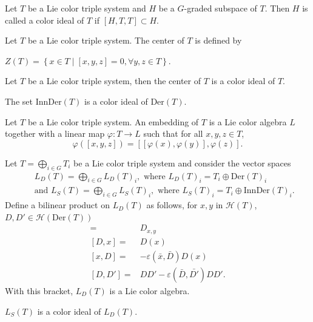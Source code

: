 \documentclass[11pt, twoside]{article}
\begin{document}
\begin{defi}[\cite{KZ23}]
    Let $T$ be a Lie color triple system and $H $ be a $G $-graded subspace of $T$. Then $H$ is called a color ideal of $T$ if $[H,T,T]\subset H $.
\end{defi}

\begin{defi}
    Let $T$ be a Lie color triple system. The center of $T$ is defined by \begin{center}
        $Z(T)=\left\{x\in T \mid [x,y,z]=0, \forall y,z\in T \right\}  $.
    \end{center}
\end{defi}

\begin{prop}
    Let $T$ be a Lie color triple system, then the center of $T$ is a color ideal of $T$.
\end{prop}

\begin{thm}[\cite{KZ23}]
  The set   $\mathrm{InnDer}(T)$ is a color ideal of $\mathrm{Der}(T)$.
\end{thm}

\begin{defi}
    Let $T$ be a Lie color triple system. An embedding of $T$ is a Lie color algebra $L$  together with a linear map $\varphi: T\to L $ such that for all $x,y,z\in T $, $$\varphi([x,y,z])= [[\varphi(x),\varphi(y)],\varphi(z)]. $$
\end{defi}

Let $T= \bigoplus\limits_{i\in G}T_i $ be a Lie color triple system and consider the vector spaces \begin{eqnarray*}
  && L_D(T)= \bigoplus\limits_{i\in G}L_D(T)_i,  \text{ where } L_D(T)_i= T_i \oplus \mathrm{Der}(T)_i \\ && \text{and }L_S(T)=\bigoplus\limits_{i\in G} L_S(T)_i, \text{  where }  L_S(T)_i= T_i\oplus \mathrm{InnDer}(T)_i .  
\end{eqnarray*}
Define a bilinear product on $L_D(T)$ as follows, for $x,y$ in $\mathcal{H}(T)$, $D,D'\in \mathcal{H}(\mathrm{Der}(T))$ \begin{align*}
[x,y]= & D_{x,y} \\
[D,x]=& D(x) \\
[x,D]=&-\varepsilon(\bar{x},\bar{D})D(x) \\
[D,D']= &DD'- \varepsilon(\bar{D},\bar{D'})DD'.
\end{align*} With this bracket, $L_D(T) $ is a Lie color algebra.

\begin{prop}
    $L_S(T) $ is a color ideal of $L_D(T) $.
\end{prop}
\end{document}
